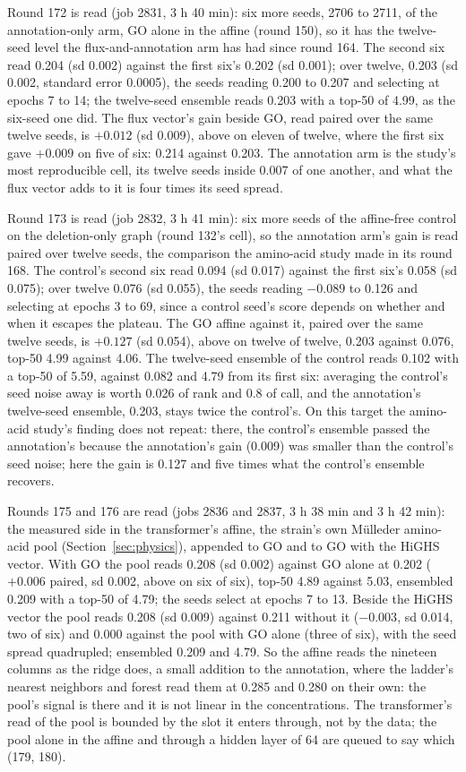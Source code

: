 Round 172 is read (job 2831, 3 h 40 min): six more seeds, 2706 to 2711, of the
annotation-only arm, GO alone in the affine (round 150), so it has the twelve-seed level
the flux-and-annotation arm has had since round 164. The second six read 0.204
(sd 0.002) against the first six's 0.202 (sd 0.001); over twelve, 0.203 (sd 0.002,
standard error 0.0005), the seeds reading 0.200 to 0.207 and selecting at epochs 7 to
14; the twelve-seed ensemble reads 0.203 with a top-50 of 4.99, as the six-seed one
did. The flux vector's gain beside GO, read paired over the same twelve seeds, is
$+0.012$ (sd 0.009), above on eleven of twelve, where the first six gave $+0.009$ on
five of six: 0.214 against 0.203. The annotation arm is the study's most reproducible
cell, its twelve seeds inside 0.007 of one another, and what the flux vector adds to it
is four times its seed spread.

Round 173 is read (job 2832, 3 h 41 min): six more seeds of the affine-free control on
the deletion-only graph (round 132's cell), so the annotation arm's gain is read paired
over twelve seeds, the comparison the amino-acid study made in its round 168. The
control's second six read 0.094 (sd 0.017) against the first six's 0.058 (sd 0.075);
over twelve 0.076 (sd 0.055), the seeds reading $-0.089$ to 0.126 and selecting at
epochs 3 to 69, since a control seed's score depends on whether and when it escapes the
plateau. The GO affine against it, paired over the same twelve seeds, is $+0.127$ (sd
0.054), above on twelve of twelve, 0.203 against 0.076, top-50 4.99 against 4.06. The
twelve-seed ensemble of the control reads 0.102 with a top-50 of 5.59, against 0.082
and 4.79 from its first six: averaging the control's seed noise away is worth 0.026 of
rank and 0.8 of call, and the annotation's twelve-seed ensemble, 0.203, stays twice
the control's. On this target the amino-acid study's finding does not repeat: there,
the control's ensemble passed the annotation's because the annotation's gain (0.009)
was smaller than the control's seed noise; here the gain is 0.127 and five times what
the control's ensemble recovers.

Rounds 175 and 176 are read (jobs 2836 and 2837, 3 h 38 min and 3 h 42 min): the
measured side in the transformer's affine, the strain's own M\"ulleder amino-acid pool
(Section~\ref{sec:physics}), appended to GO and to GO with the HiGHS vector. With GO the
pool reads 0.208 (sd 0.002) against GO alone at 0.202 ($+0.006$ paired, sd 0.002,
above on six of six), top-50 4.89 against 5.03, ensembled 0.209 with a top-50 of 4.79;
the seeds select at epochs 7 to 13. Beside the HiGHS vector the pool reads 0.208
(sd 0.009) against 0.211 without it ($-0.003$, sd 0.014, two of six) and 0.000 against
the pool with GO alone (three of six), with the seed spread quadrupled; ensembled 0.209
and 4.79. So the affine reads the nineteen columns as the ridge does, a small addition
to the annotation, where the ladder's nearest neighbors and forest read them at 0.285
and 0.280 on their own: the pool's signal is there and it is not linear in the
concentrations. The transformer's read of the pool is bounded by the slot it enters
through, not by the data; the pool alone in the affine and through a hidden layer of
64 are queued to say which (179, 180).

